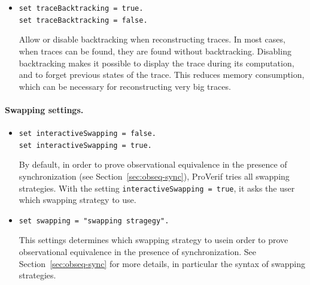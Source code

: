 \documentclass{book}
\begin{document}
\begin{itemize}
Should the derivation be displayed?
Disabling derivation display is useful for very big derivations.

\item \lstinline{set traceBacktracking = true.}\\
\lstinline{set traceBacktracking = false.}

Allow or disable backtracking when reconstructing traces.
In most cases, when traces can be found, they are found without
backtracking. Disabling backtracking makes it possible to display the
trace during its computation, and to forget previous states of the trace.
This reduces memory consumption, which can be necessary for
reconstructing very big traces.
\end{itemize}


\paragraph{Swapping settings.}
\begin{itemize}
\item \lstinline!set interactiveSwapping = false.!\\
\lstinline!set interactiveSwapping = true.!

By default, in order to prove observational equivalence in the
presence of synchronization (see Section~\ref{sec:obseq-sync}),
ProVerif tries all swapping strategies.
With the setting \lstinline!interactiveSwapping = true!, it asks
the user which swapping strategy to use.

\item \lstinline!set swapping = "swapping stragegy".!

  This settings determines which swapping strategy to usein order to
  prove observational equivalence in the presence of
  synchronization. See Section~\ref{sec:obseq-sync} for more details,
  in particular the syntax of swapping strategies.

\end{itemize}

\sloppy
\end{document}
